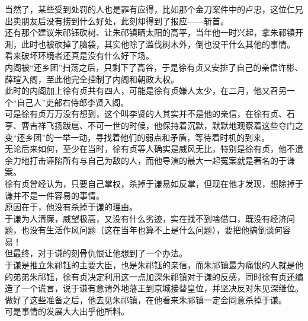 \begin{multicols}{\theparacolNo}
当然了，某些受到处罚的人也是罪有应得，比如那个金刀案件中的卢忠，这位仁兄出卖朋友后没有捞到什么好处，此刻却得到了报应——斩首。\\

还有那个建议朱祁钰砍树、让朱祁镇晒太阳的高平，当年他一时兴起，拿朱祁镇开涮，此时也被砍掉了脑袋，其实他除了滥伐树木外，倒也没干什么其他的事情。\\

看来破坏环境者还真是没有什么好下场。\\

内阁被“还乡团”扫荡之后，只剩下了高谷，于是徐有贞又安排了自己的亲信许彬、薛瑄入阁，至此他完全控制了内阁和朝政大权。\\

此时的内阁加上徐有贞共有四人，可能是徐有贞嫌人太少，在二月，他又召另一个“自己人”吏部右侍郎李贤入阁。\\

可是徐有贞万万没有想到，这个叫李贤的人其实并不是他的亲信，在徐有贞、石亨、曹吉祥飞扬跋扈、不可一世的时候，他保持着沉默，默默地观察着这些夺门之变“还乡团”的一举一动，寻找着他们的弱点和矛盾，等待着时机的到来。\\

无论后来如何，至少在当时，徐有贞等人确实是威风无比，特别是徐有贞，他不遗余力地打击诬陷所有与自己为敌的人，而他导演的最大一起冤案就是著名的于谦案。\\

徐有贞曾经认为，只要自己掌权，杀掉于谦易如反掌，但现在他才发现，想除掉于谦并不是一件容易的事情。\\

原因在于，他没有杀掉于谦的理由。\\

于谦为人清廉，威望极高，又没有什么劣迹，实在找不到啥借口，既没有经济问题，也没有生活作风问题（这在当年也算不上是什么问题），要把他搞倒谈何容易！\\

但最终，对于谦的刻骨仇恨让他想到了一个办法。\\

于谦是推立朱祁钰的主要大臣，也是朱祁钰的亲信，而朱祁镇最为痛恨的人就是他的弟弟朱祁钰，徐有贞决定利用这一点加深朱祁镇对于谦的反感，同时徐有贞还编造了一个谎言，说于谦有意请外地藩王到京城接替皇位，并坚决反对朱见深继位。\\

做好了这些准备之后，他去见朱祁镇，在他看来朱祁镇一定会同意杀掉于谦。\\

可是事情的发展大大出乎他所料。\\


\end{multicols}
